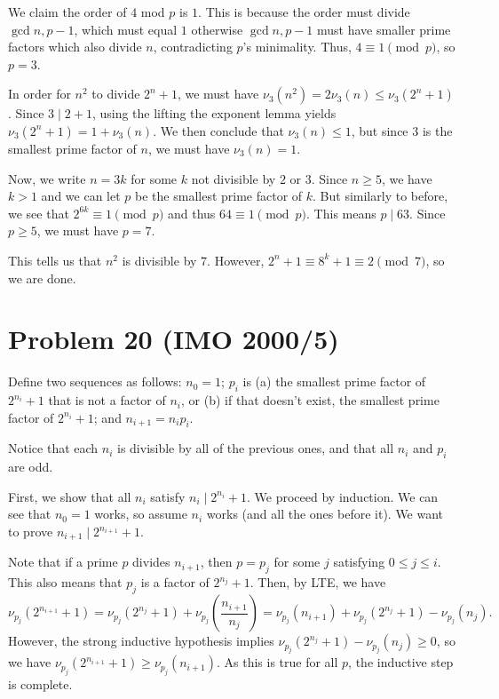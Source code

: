 \documentclass{scrartcl}
\begin{document}
We claim the order of $4$ mod $p$ is $1$. This is because the order must divide $\gcd{n, p-1}$, which must equal $1$ otherwise $\gcd{n, p-1}$ must have smaller prime factors which also divide $n$, contradicting $p$'s minimality. Thus, $4 \equiv 1 \pmod{p}$, so $p = 3$.

In order for $n^2$ to divide $2^n + 1$, we must have $\nu_3(n^2) = 2\nu_3(n) \leq \nu_3(2^n + 1)$. Since $3 \mid 2 + 1$, using the lifting the exponent lemma yields $\nu_3(2^n + 1) = 1 + \nu_3(n)$. We then conclude that $\nu_3(n) \leq 1$, but since $3$ is the smallest prime factor of $n$, we must have $\nu_3(n) = 1$.

Now, we write $n = 3k$ for some $k$ not divisible by $2$ or $3$. Since $n \geq 5$, we have $k > 1$ and we can let $p$ be the smallest prime factor of $k$. But similarly to before, we see that $2^{6k} \equiv 1 \pmod{p}$ and thus $64 \equiv 1 \pmod{p}$. This means $p \mid 63$. Since $p \geq 5$, we must have $p = 7$.

This tells us that $n^2$ is divisible by $7$. However, $2^n + 1 \equiv 8^k + 1 \equiv 2 \pmod{7}$, so we are done.

\section*{Problem 20 (IMO 2000/5)}
Define two sequences as follows: $n_0 = 1$; $p_i$ is (a) the smallest prime factor of $2^{n_i} + 1$ that is not a factor of $n_i$, or (b) if that doesn't exist, the smallest prime factor of $2^{n_i} + 1$; and $n_{i+1} = n_ip_i.$

Notice that each $n_i$ is divisible by all of the previous ones, and that all $n_i$ and $p_i$ are odd.

First, we show that all $n_i$ satisfy $n_i \mid 2^{n_i} + 1$. We proceed by induction. We can see that $n_0 = 1$ works, so assume $n_i$ works (and all the ones before it). We want to prove $n_{i+1} \mid 2^{n_{i+1}} + 1$.

Note that if a prime $p$ divides $n_{i+1}$, then $p = p_j$ for some $j$ satisfying $0 \leq j \leq i$.
This also means that $p_j$ is a factor of $2^{n_j} + 1$.
Then, by LTE, we have
\[ \nu_{p_j}(2^{n_{i+1}} + 1) = \nu_{p_j}(2^{n_j} + 1) + \nu_{p_j}\left(\frac{n_{i+1}}{n_j}\right) = \nu_{p_j}(n_{i + 1}) + \nu_{p_j}(2^{n_j}+1) - \nu_{p_j}(n_j). \]
However, the strong inductive hypothesis implies $\nu_{p_j}(2^{n_j}+1) - \nu_{p_j}(n_j) \geq 0$, so we have $\nu_{p_j}(2^{n_{i+1}} + 1) \geq \nu_{p_j}(n_{i+1})$.
As this is true for all $p$, the inductive step is complete.
\end{document}
